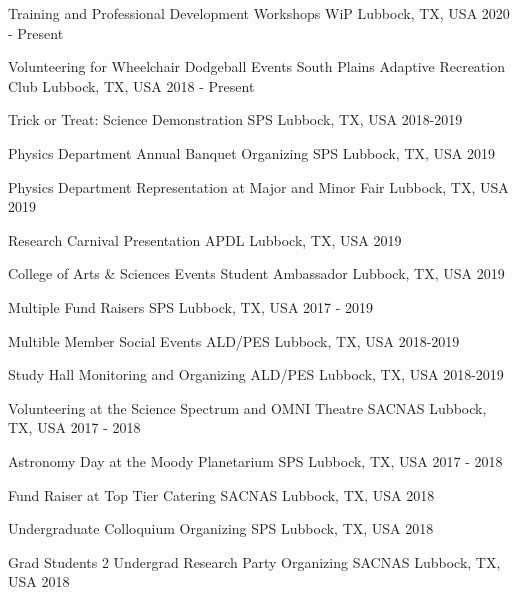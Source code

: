 
\begin{cvhonors}

    \cvhonor
    {Training and Professional Development Workshops}
    {WiP}
    {Lubbock, TX, USA}
    {2020 - Present}

    \cvhonor
    {Volunteering for Wheelchair Dodgeball Events}
    {South Plains Adaptive Recreation Club}
    {Lubbock, TX, USA}
    {2018 - Present}

    \cvhonor
    {Trick or Treat: Science Demonstration}
    {SPS}
    {Lubbock, TX, USA}
    {2018-2019}

    \cvhonor
    {Physics Department Annual Banquet Organizing}
    {SPS}
    {Lubbock, TX, USA}
    {2019}

    \cvhonor
    {Physics Department Representation at Major and Minor Fair}
    {}
    {Lubbock, TX, USA}
    {2019}

    \cvhonor
    {Research Carnival Presentation}
    {APDL}
    {Lubbock, TX, USA}
    {2019}

    \cvhonor
    {College of Arts \& Sciences Events}
    {Student Ambassador}
    {Lubbock, TX, USA}
    {2019}


    \cvhonor
    {Multiple Fund Raisers}
    {SPS}
    {Lubbock, TX, USA}
    {2017 - 2019}

    \cvhonor
    {Multible Member Social Events}
    {ALD/PES}
    {Lubbock, TX, USA}
    {2018-2019}

    \cvhonor
    {Study Hall Monitoring and Organizing}
    {ALD/PES}
    {Lubbock, TX, USA}
    {2018-2019}

    \cvhonor
    {Volunteering at the Science Spectrum and OMNI Theatre}
    {SACNAS}
    {Lubbock, TX, USA}
    {2017 - 2018}

    \cvhonor
    {Astronomy Day at the Moody Planetarium}
    {SPS}
    {Lubbock, TX, USA}
    {2017 - 2018}

    \cvhonor
    {Fund Raiser at Top Tier Catering}
    {SACNAS}
    {Lubbock, TX, USA}
    {2018}

    \cvhonor
    {Undergraduate Colloquium Organizing}
    {SPS}
    {Lubbock, TX, USA}
    {2018}


    \cvhonor
    {Grad Students 2 Undergrad Research Party Organizing}
    {SACNAS}
    {Lubbock, TX, USA}
    {2018}


\end{cvhonors}
